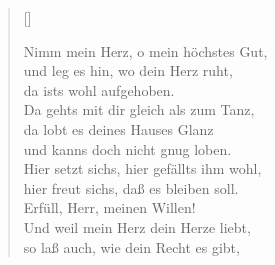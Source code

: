 \begin{center}
\settowidth{\versewidth}{Der, vor dem die Welt erschrickt,}
\begin{verse}[\versewidth]

  


 Nimm mein Herz, o mein höchstes Gut,\\
und leg es hin, wo dein Herz ruht,\\
da ists wohl aufgehoben.\\
Da gehts mit dir gleich als zum Tanz,\\
da lobt es deines Hauses Glanz\\
und kanns doch nicht gnug loben.\\
Hier setzt sichs, hier gefällts ihm wohl,\\
hier freut sichs, daß es bleiben soll.\\
Erfüll, Herr, meinen Willen!\\
Und weil mein Herz dein Herze liebt,\\
so laß auch, wie dein Recht es gibt,

\end{verse}
\end{center}






